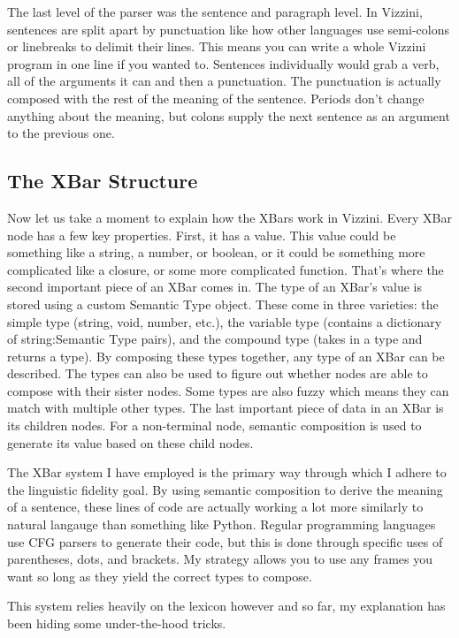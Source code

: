 \documentclass[titlepage]{article}
\newcommand{\langName}{Vizzini}
\begin{document}
The last level of the parser was the sentence and paragraph level. In \langName{}, sentences are split apart by punctuation like how other languages use semi-colons or linebreaks to delimit their lines. This means you can write a whole \langName{} program in one line if you wanted to. Sentences individually would grab a verb, all of the arguments it can and then a punctuation. The punctuation is actually composed with the rest of the meaning of the sentence. Periods don't change anything about the meaning, but colons supply the next sentence as an argument to the previous one.

\subsection*{The XBar Structure}
Now let us take a moment to explain how the XBars work in \langName{}. Every XBar node has a few key properties. First, it has a value. This value could be something like a string, a number, or boolean, or it could be something more complicated like a closure, or some more complicated function. That's where the second important piece of an XBar comes in. The type of an XBar's value is stored using a custom Semantic Type object. These come in three varieties: the simple type (string, void, number, etc.), the variable type (contains a dictionary of string:Semantic Type pairs), and the compound type (takes in a type and returns a type). By composing these types together, any type of an XBar can be described. The types can also be used to figure out whether nodes are able to compose with their sister nodes. Some types are also fuzzy which means they can match with multiple other types. The last important piece of data in an XBar is its children nodes. For a non-terminal node, semantic composition is used to generate its value based on these child nodes.

The XBar system I have employed is the primary way through which I adhere to the linguistic fidelity goal. By using semantic composition to derive the meaning of a sentence, these lines of code are actually working a lot more similarly to natural langauge than something like Python. Regular programming languages use CFG parsers to generate their code, but this is done through specific uses of parentheses, dots, and brackets. My strategy allows you to use any frames you want so long as they yield the correct types to compose.

This system relies heavily on the lexicon however and so far, my explanation has been hiding some under-the-hood tricks.
\end{document}

